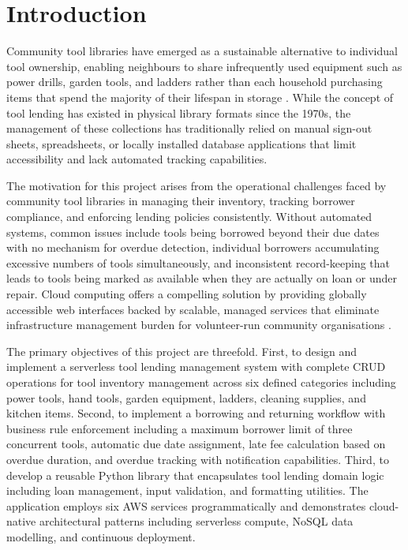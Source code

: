\documentclass[conference]{IEEEtran}
\begin{document}
\section{Introduction}

Community tool libraries have emerged as a sustainable alternative to individual tool ownership, enabling neighbours to share infrequently used equipment such as power drills, garden tools, and ladders rather than each household purchasing items that spend the majority of their lifespan in storage \cite{cloudpatterns}. While the concept of tool lending has existed in physical library formats since the 1970s, the management of these collections has traditionally relied on manual sign-out sheets, spreadsheets, or locally installed database applications that limit accessibility and lack automated tracking capabilities.

The motivation for this project arises from the operational challenges faced by community tool libraries in managing their inventory, tracking borrower compliance, and enforcing lending policies consistently. Without automated systems, common issues include tools being borrowed beyond their due dates with no mechanism for overdue detection, individual borrowers accumulating excessive numbers of tools simultaneously, and inconsistent record-keeping that leads to tools being marked as available when they are actually on loan or under repair. Cloud computing offers a compelling solution by providing globally accessible web interfaces backed by scalable, managed services that eliminate infrastructure management burden for volunteer-run community organisations \cite{serverless}.

The primary objectives of this project are threefold. First, to design and implement a serverless tool lending management system with complete CRUD operations for tool inventory management across six defined categories including power tools, hand tools, garden equipment, ladders, cleaning supplies, and kitchen items. Second, to implement a borrowing and returning workflow with business rule enforcement including a maximum borrower limit of three concurrent tools, automatic due date assignment, late fee calculation based on overdue duration, and overdue tracking with notification capabilities. Third, to develop a reusable Python library that encapsulates tool lending domain logic including loan management, input validation, and formatting utilities. The application employs six AWS services programmatically and demonstrates cloud-native architectural patterns including serverless compute, NoSQL data modelling, and continuous deployment.
\end{document}
